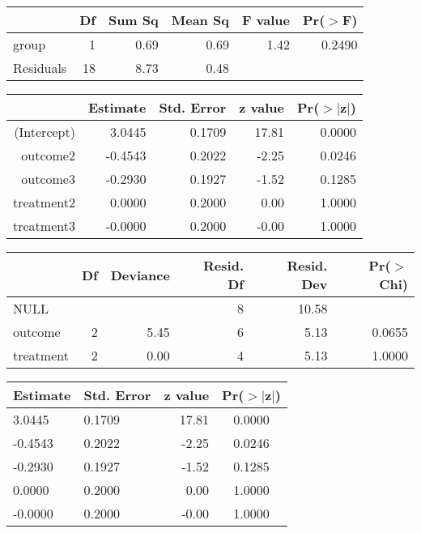 \begin{table}[ht]
\centering
\begin{tabular}{lrrrrr}
  \hline
 & Df & Sum Sq & Mean Sq & F value & Pr($>$F) \\ 
  \hline
group & 1 & 0.69 & 0.69 & 1.42 & 0.2490 \\ 
  Residuals & 18 & 8.73 & 0.48 &  &  \\ 
   \hline
\end{tabular}
\end{table}
\begin{table}[ht]
\centering
\begin{tabular}{rrrrr}
  \hline
 & Estimate & Std. Error & z value & Pr($>$$|$z$|$) \\ 
  \hline
(Intercept) & 3.0445 & 0.1709 & 17.81 & 0.0000 \\ 
  outcome2 & -0.4543 & 0.2022 & -2.25 & 0.0246 \\ 
  outcome3 & -0.2930 & 0.1927 & -1.52 & 0.1285 \\ 
  treatment2 & 0.0000 & 0.2000 & 0.00 & 1.0000 \\ 
  treatment3 & -0.0000 & 0.2000 & -0.00 & 1.0000 \\ 
   \hline
\end{tabular}
\end{table}
\begin{table}[ht]
\centering
\begin{tabular}{lrrrrr}
  \hline
 & Df & Deviance & Resid. Df & Resid. Dev & Pr($>$Chi) \\ 
  \hline
NULL &  &  & 8 & 10.58 &  \\ 
  outcome & 2 & 5.45 & 6 & 5.13 & 0.0655 \\ 
  treatment & 2 & 0.00 & 4 & 5.13 & 1.0000 \\ 
   \hline
\end{tabular}
\end{table}
\begin{table}[ht]
\centering
\begin{tabular}{|llrc}
  \hline
Estimate & Std. Error & z value & Pr($>$$|$z$|$) \\ 
  \hline
3.0445 & 0.1709 & 17.81 & 0.0000 \\ 
  -0.4543 & 0.2022 & -2.25 & 0.0246 \\ 
  -0.2930 & 0.1927 & -1.52 & 0.1285 \\ 
  0.0000 & 0.2000 & 0.00 & 1.0000 \\ 
  -0.0000 & 0.2000 & -0.00 & 1.0000 \\ 
   \hline
\end{tabular}
\end{table}
